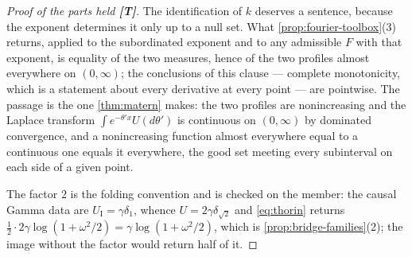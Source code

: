 \begin{proof}[Proof of the parts held \textbf{[T]}]
The identification of $k$ deserves a sentence, because the exponent determines it only up to a
null set. What \ref{prop:fourier-toolbox}(3) returns, applied to the subordinated exponent and to
any admissible $F$ with that exponent, is equality of the two \Levy{} measures, hence of the two
profiles almost everywhere on $(0,\infty)$; the conclusions of this clause --- complete
monotonicity, which is a statement about every derivative at every point --- are pointwise. The
passage is the one \ref{thm:matern} makes: the two profiles are nonincreasing and the Laplace
transform $\int e^{-\theta'x}U(d\theta')$ is continuous on $(0,\infty)$ by dominated convergence,
and a nonincreasing function almost everywhere equal to a continuous one equals it everywhere,
the good set meeting every subinterval on each side of a given point.

The factor $2$ is the folding convention and is
checked on the \Matern{} member: the causal Gamma data are $U_{\mathrm I} = \gamma\delta_1$,
whence $U = 2\gamma\delta_{\sqrt2}$ and \ref{eq:thorin} returns
$\tfrac12\cdot 2\gamma\log(1+\omega^2/2) = \gamma\log(1+\omega^2/2)$, which is
\ref{prop:bridge-families}(2); the image without the factor would return half of it.


\end{proof}
